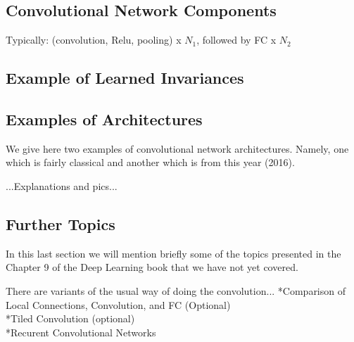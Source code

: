 \documentclass[]{article}
\begin{document}
\subsection{Convolutional Network Components}
Typically: (convolution, Relu, pooling) x $N_1$, followed by FC x $N_2$


\subsection{Example of Learned Invariances}


\subsection{Examples of Architectures}
We give here two examples of convolutional network architectures. Namely, one
which is fairly classical and another which is from this year (2016).

...Explanations and pics...

\subsection{Further Topics}
In this last section we will mention briefly some of the topics presented in the
Chapter 9 of the Deep Learning book that we have not yet covered.

There are variants of the usual way of doing the convolution...
\newline
*Comparison of Local Connections, Convolution, and FC (Optional)\\
*Tiled Convolution (optional)\\
*Recurent Convolutional Networks


\end{document}
